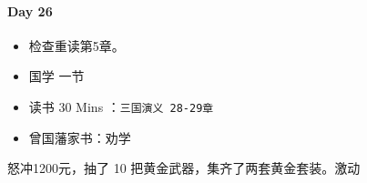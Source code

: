 \documentclass[UTF8,a4paper,8pt]{ctexart}
\begin{document}
 	 \paragraph{Day 26      \quad     }
	 	 \begin{itemize}[itemindent = 1em]
	 	 	\renewcommand\labelitemi{\makebox[0pt][l]{$\square$}\raisebox{.15ex}{\hspace{0.1em}$\checkmark$}}		
	 	 	
	 	 	\item    检查重读第5章。
	 	 	
	 	 	
	 	 	\renewcommand\labelitemi{\makebox[0pt][l]{$\square$}\hspace{1em}}
	 	 	\item   国学  一节
	 	 	\item   读书  30 Mins	：\verb|三国演义 28-29章|
	 	 	\item   曾国藩家书：劝学
	 	 \end{itemize}
	 	 
	 	 怒冲1200元，抽了 10 把黄金武器，集齐了两套黄金套装。激动
\end{document}
